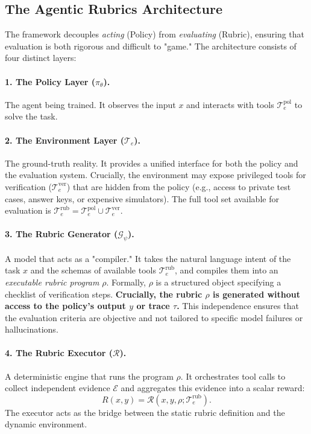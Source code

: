 \subsection{The Agentic Rubrics Architecture}
\label{sec:architecture}

The framework decouples \textit{acting} (Policy) from \textit{evaluating} (Rubric), ensuring that evaluation is both rigorous and difficult to "game." The architecture consists of four distinct layers:

\paragraph{1. The Policy Layer ($\pi_\theta$).}
The agent being trained. It observes the input $x$ and interacts with tools $\mathcal{T}_e^{\text{pol}}$ to solve the task.

\paragraph{2. The Environment Layer ($\mathcal{T}_e$).}
The ground-truth reality. It provides a unified interface for both the policy and the evaluation system.
Crucially, the environment may expose privileged tools for verification ($\mathcal{T}_e^{\text{ver}}$) that are hidden from the policy (e.g., access to private test cases, answer keys, or expensive simulators).
The full tool set available for evaluation is $\mathcal{T}_e^{\text{rub}} = \mathcal{T}_e^{\text{pol}} \cup \mathcal{T}_e^{\text{ver}}$.

\paragraph{3. The Rubric Generator ($\mathcal{G}_\psi$).}
A model that acts as a "compiler." It takes the natural language intent of the task $x$ and the schemas of available tools $\mathcal{T}_e^{\text{rub}}$, and compiles them into an \textit{executable rubric program} $\rho$.
Formally, $\rho$ is a structured object specifying a checklist of verification steps.
\textbf{Crucially, the rubric $\rho$ is generated without access to the policy's output $y$ or trace $\tau$.}
This independence ensures that the evaluation criteria are objective and not tailored to specific model failures or hallucinations.

\paragraph{4. The Rubric Executor ($\mathcal{R}$).}
A deterministic engine that runs the program $\rho$.
It orchestrates tool calls to collect independent evidence $\mathcal{E}$ and aggregates this evidence into a scalar reward:
\begin{equation}
R(x, y) = \mathcal{R}(x, y, \rho; \mathcal{T}_e^{\text{rub}}).
\end{equation}
The executor acts as the bridge between the static rubric definition and the dynamic environment.

